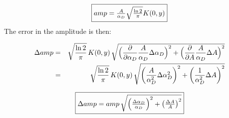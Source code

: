 \documentclass[10pt,a4paper]{report}
\begin{document}
\begin{flushleft}
\begin{equation}
\framebox {$
amp = \frac {A} {\alpha_D} \sqrt{\frac {\ln 2} {\pi}} K(0,y) 
$}
\end{equation}
The error in the amplitude is then:


\begin{eqnarray*}
\Delta amp &=& \sqrt{\frac {\ln 2}{\pi}} \, K(0,y)\,  
\sqrt{\Bigl(\frac {\partial} {\partial\alpha_D} 
\frac {A} {\alpha_D} \Delta \alpha_D \Bigr)^2 + 
\Bigl(\frac {\partial} {\partial A} \frac {A} {\alpha_D} \Delta A \Bigr)^2}\\
&=& \sqrt{\frac {\ln 2} {\pi}} \, K(0,y)\,
\sqrt{  { \left( \frac{A}{\alpha_D ^2}\Delta\alpha_D^2\right)}^2+
        {\left(\frac{1}{\alpha_D ^2}\Delta A \right)}^2 }
\end{eqnarray*} 

\begin{equation}
\framebox {$ \Delta amp =
amp\, \sqrt{ {\left(\frac{\Delta\alpha_D}{\alpha_D}\right)}^2 + 
                {\left(\frac{\Delta A}{A} \right) }^2  }
$}
\end{equation}



\end{flushleft}
\end{document}
